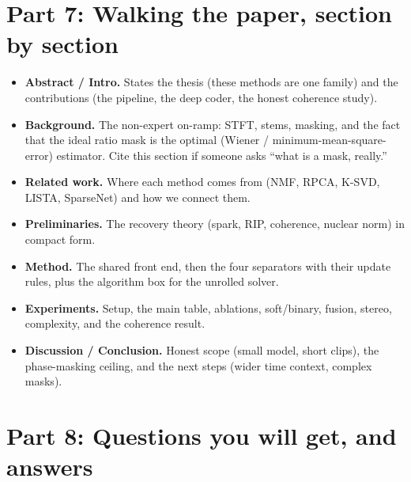 \documentclass[11pt]{article}
\begin{document}
\section{Part 7: Walking the paper, section by section}
\begin{itemize}
\item \textbf{Abstract / Intro.} States the thesis (these methods are one family) and
the contributions (the pipeline, the deep coder, the honest coherence study).
\item \textbf{Background.} The non-expert on-ramp: STFT, stems, masking, and the
fact that the ideal ratio mask is the optimal (Wiener / minimum-mean-square-error)
estimator. Cite this section if someone asks ``what is a mask, really.''
\item \textbf{Related work.} Where each method comes from (NMF, RPCA, K-SVD, LISTA,
SparseNet) and how we connect them.
\item \textbf{Preliminaries.} The recovery theory (spark, RIP, coherence, nuclear
norm) in compact form.
\item \textbf{Method.} The shared front end, then the four separators with their
update rules, plus the algorithm box for the unrolled solver.
\item \textbf{Experiments.} Setup, the main table, ablations, soft/binary, fusion,
stereo, complexity, and the coherence result.
\item \textbf{Discussion / Conclusion.} Honest scope (small model, short clips), the
phase-masking ceiling, and the next steps (wider time context, complex masks).
\end{itemize}

\section{Part 8: Questions you will get, and answers}
\end{document}
